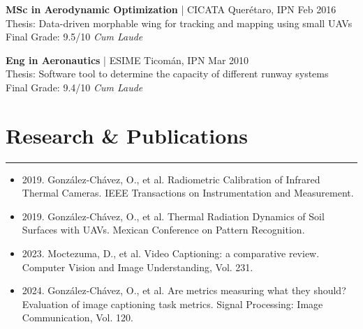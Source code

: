 \documentclass[11pt]{article}
\begin{document}
\vspace{8pt}
\noindent
\textbf{MSc in Aerodynamic Optimization} | CICATA Quer\'etaro, IPN \hfill Feb 2016 \\
Thesis: Data-driven morphable wing for tracking and mapping using small UAVs \\
Final Grade: 9.5/10 \hfill \textit{Cum Laude}

\vspace{8pt}
\noindent
\textbf{Eng in Aeronautics} | ESIME Ticom\'an, IPN \hfill Mar 2010 \\
Thesis: Software tool to determine the capacity of different runway systems \\
Final Grade: 9.4/10 \hfill \textit{Cum Laude}

\section{Research \& Publications}
\vspace{-10pt}
\noindent\rule{\textwidth}{0.4pt}
\begin{itemize}
\item 2019. Gonz\'alez-Ch\'avez, O., et al. Radiometric Calibration of Infrared Thermal Cameras. IEEE Transactions on Instrumentation and Measurement.
\item 2019. Gonz\'alez-Ch\'avez, O., et al. Thermal Radiation Dynamics of Soil Surfaces with UAVs. Mexican Conference on Pattern Recognition.
\item 2023. Moctezuma, D., et al. Video Captioning: a comparative review. Computer Vision and Image Understanding, Vol. 231.
\item 2024. Gonz\'alez-Ch\'avez, O., et al. Are metrics measuring what they should? Evaluation of image captioning task metrics. Signal Processing: Image Communication, Vol. 120.
\end{itemize}
\end{document}
